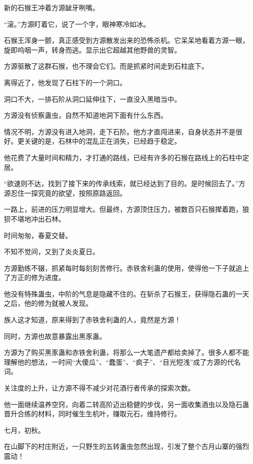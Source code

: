 \begin{this_body}
新的石猴王冲着方源龇牙咧嘴。

“滚。”方源盯着它，说了一个字，眼神寒冷如冰。

石猴王浑身一颤，真正感受到方源散发出来的恐怖杀机。它呆呆地看着方源一眼，旋即呜咽一声，转身而逃。显示出它超越其他野兽的灵智。

方源驱散了这群石猴，也不理会它们。而是抓紧时间走到石柱底下。

离得近了，他发现了石柱下的一个洞口。

洞口不大，一排石阶从洞口延伸往下，一直没入黑暗当中。

方源没有侦察蛊虫，自然不知道地洞下面有什么东西。

情况不明，方源没有进入地洞，走下石阶。他方才直闯进来，自身状态并不是很好。更关键的是，石林中的混乱正在消失，已经趋于稳定。

他花费了大量时间和精力，才打通的路线，已经有许多的石猴在路线上的石柱中定居。

“欲速则不达，找到了接下来的传承线索，就已经达到了目的。是时候回去了。”方源忍住一探究竟的欲望，按照原路返回。

一路上，前进的压力明显增大。但最终，方源顶住压力，被数百只石猴撵着跑，狼狈不堪地冲出石林。

时间匆匆，春夏交替。

不知不觉间，又到了炎炎夏日。

方源勤练不辍，抓紧每时每刻刻苦修行。赤铁舍利蛊的使用，使得他一下子就追上了方正的修为进度。

他没有特殊蛊虫，中阶的气息是隐藏不住的。在斩杀了石猴王，获得隐石蛊的一天之后，他的修为就被人发现。

族人这才知道，原来得到了赤铁舍利蛊的人，竟然是方源！

同时，方源也故意暴露出黑豕蛊。

方源为了购买黑豕蛊和赤铁舍利蛊，将那么一大笔遗产都给卖掉了。很多人都不能理解他的想法，一时间“大傻瓜”、“蠢蛋”、“疯子”、“目光短浅”成了方源的代名词。

关注度的上升，让方源不得不减少对花酒行者传承的探索次数。

他一面继续温养空窍，向着二转高阶迈出稳健的步伐，另一面收集酒虫以及隐石蛊晋升合练的材料，同时催生生机叶，赚取元石，维持修行。

七月，初秋。

在山脚下的村庄附近，一只野生的五转蛊虫忽然出现，引发了整个古月山寨的强烈震动！

\end{this_body}

